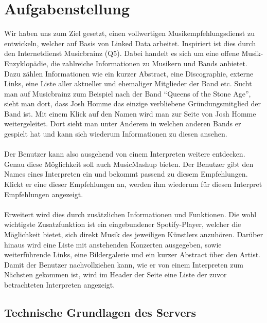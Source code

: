 \section{Aufgabenstellung}


Wir haben uns zum Ziel gesetzt, einen vollwertigen Musikempfehlungsdienst zu entwickeln, welcher auf Basis von Linked Data arbeitet. Inspiriert ist dies durch den Internetdienst Musicbrainz (Q5). Dabei handelt es sich um eine offene Musik-Enzyklopädie, die zahlreiche Informationen zu Musikern und Bands anbietet. Dazu zählen Informationen wie ein kurzer Abstract, eine Discographie, externe Links, eine Liste aller aktueller und ehemaliger Mitglieder der Band etc. Sucht man auf Musicbrainz zum Beispiel nach der Band “Queens of the Stone Age”, sieht man dort, dass Josh Homme das einzige verbliebene Gründungsmitglied der Band ist. Mit einem Klick auf den Namen wird man zur Seite von Josh Homme weitergeleitet. Dort sieht man unter Anderem in welchen anderen Bands er gespielt hat und kann sich wiederum Informationen zu diesen ansehen.

\paragraph{} Der Benutzer kann also ausgehend von einem Interpreten weitere entdecken. Genau diese Möglichkeit soll auch MusicMashup bieten. Der Benutzer gibt den Names eines Interpreten ein und bekommt passend zu diesem Empfehlungen. Klickt er eine dieser Empfehlungen an, werden ihm wiederum für diesen Interpret Empfehlungen angezeigt. 


\paragraph{} Erweitert wird dies durch zusätzlichen Informationen und Funktionen. Die wohl wichtigste Zusatzfunktion ist ein eingebundener Spotify-Player, welcher die Möglichkeit bietet, sich direkt Musik des jeweiligen Künstlers anzuhören. Darüber hinaus wird eine Liste mit anstehenden Konzerten ausgegeben, sowie weiterführende Links, eine Bildergalerie und ein kurzer Abstract über den Artist. Damit der Benutzer nachvollziehen kann, wie er von einem Interpreten zum Nächsten gekommen ist, wird im Header der Seite eine Liste der zuvor betrachteten Interpreten angezeigt.

\subsection{Technische Grundlagen des Servers}

